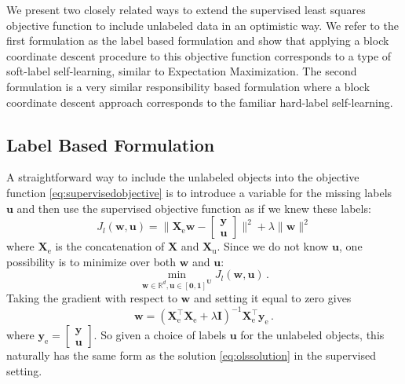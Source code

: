 \documentclass[twoside]{memoir}\usepackage[]{graphicx}\usepackage{xcolor}
\newcommand{\Xe}{\mathbf{X}_\mathrm{e}  }
\begin{document}
We present two closely related ways to extend the supervised least squares objective function to include unlabeled data in an optimistic way. We refer to the first formulation as the label based formulation and show that applying a block coordinate descent procedure to this objective function corresponds to a type of soft-label self-learning, similar to Expectation Maximization. The second formulation is a very similar responsibility based formulation where a block coordinate descent approach corresponds to the familiar hard-label self-learning.

\subsection{Label Based Formulation}
A straightforward way to include the unlabeled objects into the objective function \eqref{eq:supervisedobjective} is to introduce a variable for the missing labels $\mathbf{u}$ and then use the supervised objective function as if we knew these labels:
$$
J_l(\mathbf{w},\mathbf{u}) = \| \Xe \mathbf{w}-\begin{bmatrix} \mathbf{y} \\ \mathbf{u} \end{bmatrix} \|^2 + \lambda \|\mathbf{w} \|^2
$$
where $\Xe$ is the concatenation of $\mathbf{X}$ and $\mathbf{X}_\text{u}$. Since we do not know $\mathbf{u}$, one possibility is to minimize over both $\mathbf{w}$ and $\mathbf{u}$:
$$
\min_{\mathbf{w}\in \mathbb{R}^d,\mathbf{\mathbf{u} \in [0,1]^U}} J_l(\mathbf{w},\mathbf{u}) \,.
$$
Taking the gradient with respect to $\mathbf{w}$ and setting it equal to zero gives
$$
\mathbf{w} = \left( \mathbf{X}_\text{e}^\top \mathbf{X}_\text{e}  + \lambda \mathbf{I} \right)^{-1} \mathbf{X}_\text{e}^\top \mathbf{y}_\text{e} \,.
$$
where $\mathbf{y}_\text{e}=\begin{bmatrix} \mathbf{y} \\ \mathbf{u} \end{bmatrix}$. So given a choice of labels $\mathbf{u}$ for the unlabeled objects, this naturally has the same form as the solution \eqref{eq:olssolution} in the supervised setting.
\end{document}
